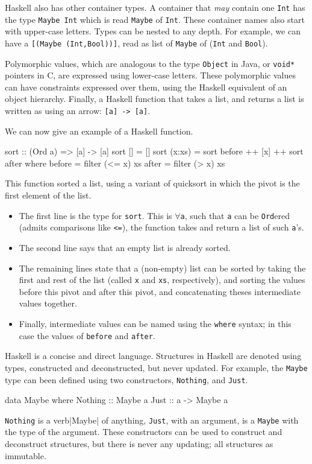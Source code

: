 \documentclass[11pt]{article}
\begin{document}
Haskell also has other container types. A container
that {\em may\/} contain one \verb|Int| has the type
\verb|Maybe Int|
which is read \verb|Maybe| of \verb|Int|.
These container names also start with upper-case letters.
Types can be nested to any depth. For example, we can have a \verb|[(Maybe (Int,Bool))]|,
read as list of \verb|Maybe| of (\verb|Int| and \verb|Bool|).

Polymorphic values, which are analogous to the type \verb|Object| in Java,
or \verb|void*| pointers in C, are expressed using lower-case letters.
These polymorphic values can have constraints expressed over them,
using the Haskell equivalent of an object hierarchy.
Finally, a Haskell function that takes a list, and returns a list
is written as using an arrow: \verb|[a] -> [a]|.

We can now give an example of a Haskell function.%
\begin{Code}

sort :: (Ord a) => [a] -> [a]
sort []     = []
sort (x:xs) = sort before ++ [x] ++ sort after
  where
        before = filter (<= x) xs
        after  = filter (> x) xs

\end{Code}
This function sorted a list, using a variant of quicksort in which the pivot is
the first element of the list.
\begin{itemize}
\item The first line is the type for \verb|sort|. This is $\forall$\verb|a|, such that
\verb|a| can be \verb|Ord|ered (admits comparisons like \verb|<=|), the function
takes and return a list of such \verb|a|'s.
\item The second line says that an empty list is already sorted.
\item The remaining lines state that a (non-empty) list can be
sorted by taking the first and rest of the list (called \verb|x| and \verb|xs|, respectively),
and sorting the values before this pivot and after this pivot,
and concatenating theses intermediate values together.
\item Finally, intermediate values can be named using the \verb|where| syntax;
in this case the values of \verb|before| and \verb|after|.
\end{itemize}

Haskell is a concise and direct language.
Structures in Haskell are denoted using types, constructed
and deconstructed, but never updated. For example, the \verb|Maybe| type
can been defined using two constructors, \verb|Nothing|, and \verb|Just|.
\begin{Code}
        
data Maybe where
  Nothing ::      Maybe a
  Just    :: a -> Maybe a

\end{Code}
\verb|Nothing| is a verb|Maybe| of anything, \verb|Just|, with an argument,
is a \verb|Maybe| with the type of the argument. These constructors can be
used to construct and deconstruct structures, but there is never any updating;
all structures as immutable.
\end{document}
